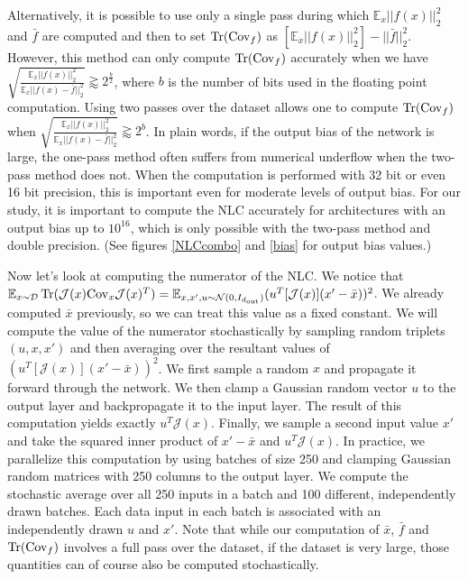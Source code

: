 \documentclass{article} %
\begin{document}
Alternatively, it is possible to use only a single pass during which $ \mathbb{E}_x ||f(x)||_2^2$ and $\bar{f}$ are computed and then to set $\operatorname{Tr}(\mathrm{Cov}_f)$ as $[\mathbb{E}_x ||f(x)||_2^2] - ||\bar{f}||_2^2$. However, this method can only compute $\operatorname{Tr}(\mathrm{Cov}_f)$ accurately when we have $\sqrt{\frac{\mathbb{E}_x||f(x)||_2^2}{\mathbb{E}_x||f(x)-\bar{f}||_2^2}} \gtrapprox 2^{\frac{b}{2}}$, where $b$ is the number of bits used in the floating point computation. Using two passes over the dataset allows one to compute $\operatorname{Tr}(\mathrm{Cov}_f)$ when $\sqrt{\frac{\mathbb{E}_x||f(x)||_2^2}{\mathbb{E}_x||f(x)-\bar{f}||_2^2}} \gtrapprox 2^b$. In plain words, if the output bias of the network is large, the one-pass method often suffers from numerical underflow when the two-pass method does not. When the computation is performed with 32 bit or even 16 bit precision, this is important even for moderate levels of output bias. For our study, it is important to compute the NLC accurately for architectures with an output bias up to $10^{16}$, which is only possible with the two-pass method and double precision. (See figures \ref{NLCcombo} and \ref{bias} for output bias values.)

Now let's look at computing the numerator of the NLC. We notice that $\mathbb{E}_{x \sim \mathcal{D}}\operatorname{Tr}(\mathcal{J}(x)\mathrm{Cov}_x\mathcal{J}(x)^T) = \mathbb{E}_{x,x',u \sim \mathcal{N}(0,I_{d_\text{out}})} (u^T[\mathcal{J}(x)](x' - \bar{x}))^2$. We already computed $\bar{x}$ previously, so we can treat this value as a fixed constant. We will compute the value of the numerator stochastically by sampling random triplets $(u,x,x')$ and then averaging over the resultant values of $(u^T[\mathcal{J}(x)](x' - \bar{x}))^2$. We first sample a random $x$ and propagate it forward through the network. We then clamp a Gaussian random vector $u$ to the output layer and backpropagate it to the input layer. The result of this computation yields exactly $u^T\mathcal{J}(x)$. Finally, we sample a second input value $x'$ and take the squared inner product of $x' - \bar{x}$ and $u^T\mathcal{J}(x)$. In practice, we parallelize this computation by using batches of size 250 and clamping Gaussian random matrices with 250 columns to the output layer. We compute the stochastic average over all 250 inputs in a batch and 100 different, independently drawn batches. Each data input in each batch is associated with an independently drawn $u$ and $x'$. Note that while our computation of $\bar{x}$, $\bar{f}$ and $\operatorname{Tr}(\mathrm{Cov}_f)$ involves a full pass over the dataset, if the dataset is very large, those quantities can of course also be computed stochastically. 
\end{document}
